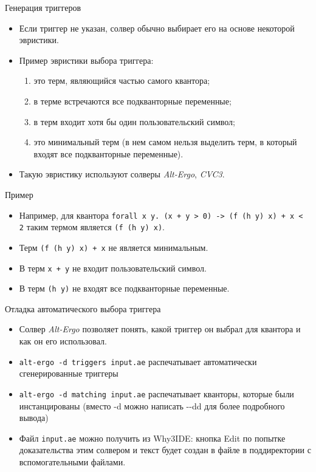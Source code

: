 \documentclass[hyperref={unicode=true}]{beamer}
\begin{document}
    \begin{frame}{Генерация триггеров}
    \begin{itemize}
    \item
    Если триггер не указан, солвер обычно выбирает его на основе
    некоторой эвристики.
    \item
    Пример эвристики выбора триггера:
        \begin{enumerate}
        \item это терм, являющийся частью самого квантора;
        \item в терме встречаются все подкванторные переменные;
        \item в терм входит хотя бы один пользовательский символ;
        \item это минимальный терм (в нем самом нельзя выделить
                терм, в который входят все подкванторные переменные).
        \end{enumerate}
    \item
    Такую эвристику используют солверы \textsl{Alt-Ergo}, \textsl{CVC3}.
    \end{itemize}
    \end{frame}

    \begin{frame}{Пример}
    \begin{itemize}
    \item Например, для квантора \texttt{forall x y. (x + y > 0) -> (f (h y) x) + x < 2}
    таким термом является \texttt{(f (h y) x)}.
    \item Терм \texttt{(f (h y) x) + x} не является
    минимальным.
    \item В терм \texttt{x + y} не входит пользовательский символ.
    \item В терм \texttt{(h y)} не входят все подкванторные переменные.
    \end{itemize}
    \end{frame}

    \begin{frame}{Отладка автоматического выбора триггера}
    \begin{itemize}
    \item
    Солвер \textsl{Alt-Ergo} позволяет понять, какой триггер он выбрал
    для квантора и как он его использовал.
    \item
    \texttt{alt-ergo -d triggers input.ae} распечатывает
    автоматически сгенерированные триггеры
    \item
    \texttt{alt-ergo -d matching input.ae} распечатывает
    кванторы, которые были инстанцированы (вместо -d можно написать -{}-dd для
            более подробного вывода)
    \item
    Файл \texttt{input.ae} можно получить из Why3IDE: кнопка Edit
    по попытке доказательства этим солвером и текст будет создан в файле
    в поддиректории с вспомогательными файлами.
    \end{itemize}
    \end{frame}
\end{document}
